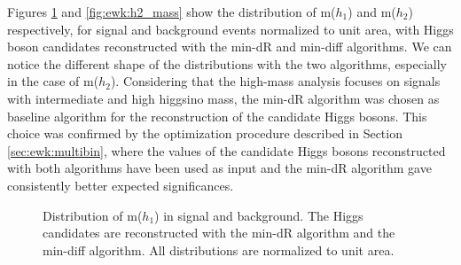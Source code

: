 Figures \ref{fig:ewk:h1_mass} and \ref{fig:ewk:h2_mass} show the distribution of m($h_1$) and m($h_2$) 
respectively, for signal and background events normalized to unit area, 
with Higgs boson candidates reconstructed with the min-dR and min-diff algorithms. 
We can notice the different shape of the distributions with the two algorithms, especially in the case of m($h_2$). 
Considering that the high-mass analysis focuses on signals with intermediate and high higgsino mass, 
the min-dR algorithm was chosen as baseline algorithm for the reconstruction of the candidate Higgs bosons. 
This choice was confirmed by the optimization procedure described in Section \ref{sec:ewk:multibin}, 
where the values of the candidate Higgs bosons reconstructed with both algorithms have been used as input and 
the min-dR algorithm gave consistently better expected significances.  


\begin{figure}[htbp]
\centering 
{}
\caption{Distribution of m($h_1$) in signal and background. The Higgs candidates are reconstructed with 
 the min-dR algorithm and 
 the min-diff algorithm. All distributions are normalized to unit area.}
\label{fig:ewk:h1_mass}
\end{figure}

